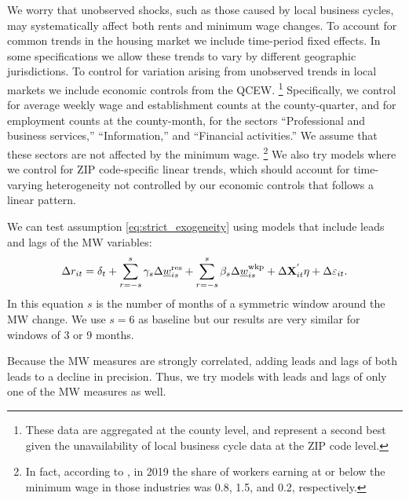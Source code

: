 We worry that unobserved shocks, such as those caused by local business cycles, 
may systematically affect both rents and minimum wage changes.
To account for common trends in the housing market we include time-period 
fixed effects.
In some specifications we allow these trends to vary by different geographic 
jurisdictions. To control for variation arising from unobserved trends in local 
markets we include economic controls from the QCEW.%
\footnote{These data are aggregated at the county level, and represent a second 
best given the unavailability of local business cycle data at the ZIP code level.}
Specifically, we control for average weekly wage and establishment counts at the 
county-quarter, and for employment counts at the county-month, for the sectors 
``Professional and business services,'' ``Information,'' and 
``Financial activities.''
We assume that these sectors are not affected by the minimum wage.%
\footnote{In fact, according to \textcite[][table 5]{MinWorkersReportBLS}, in 
2019 the share of workers earning at or below the minimum wage in those 
industries was 0.8, 1.5, and 0.2, respectively.}
We also try models where we control for ZIP code-specific linear
trends, which should account for time-varying heterogeneity not controlled by 
our economic controls that follows a linear pattern.

We can test assumption \eqref{eq:strict_exogeneity} using models that include 
leads and lags of the MW variables:
\begin{equation} \label{eq:fd_leads_lags}
    \Delta r_{it} = \delta_t
                  + \sum_{r=-s}^{s} \gamma_s \Delta \underline{w}^{\text{res}}_{is} 
                  + \sum_{r=-s}^{s} \beta_s \Delta \underline{w}^{\text{wkp}}_{is}
                  + \Delta \mathbf{X}^{'}_{it}\eta
                  + \Delta \varepsilon_{it} .
\end{equation}
In this equation $s$ is the number of months of a symmetric window around the 
MW change.
We use $s=6$ as baseline but our results are very similar for windows of 3 or 9 
months.


Because the MW measures are strongly correlated, adding leads and lags of both 
leads to a decline in precision.
Thus, we try models with leads and lags of only one of the MW measures as well.


